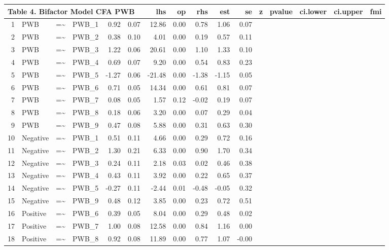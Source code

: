 \documentclass{article}
\begin{document}
\begin{table}[ht]
\centering
\begin{tabular}{rlllrrrrrrr}
 \multicolumn{ 6 }{l}{ Table 4. Bifactor Model CFA PWB} \cr 
  \hline
 & lhs & op & rhs & est & se & z & pvalue & ci.lower & ci.upper & fmi \\ 
  \hline
1 & PWB & =\~{} & PWB\_1 & 0.92 & 0.07 & 12.86 & 0.00 & 0.78 & 1.06 & 0.07 \\ 
  2 & PWB & =\~{} & PWB\_2 & 0.38 & 0.10 & 4.01 & 0.00 & 0.19 & 0.57 & 0.11 \\ 
  3 & PWB & =\~{} & PWB\_3 & 1.22 & 0.06 & 20.61 & 0.00 & 1.10 & 1.33 & 0.10 \\ 
  4 & PWB & =\~{} & PWB\_4 & 0.69 & 0.07 & 9.20 & 0.00 & 0.54 & 0.83 & 0.23 \\ 
  5 & PWB & =\~{} & PWB\_5 & -1.27 & 0.06 & -21.48 & 0.00 & -1.38 & -1.15 & 0.05 \\ 
  6 & PWB & =\~{} & PWB\_6 & 0.71 & 0.05 & 14.34 & 0.00 & 0.61 & 0.81 & 0.07 \\ 
  7 & PWB & =\~{} & PWB\_7 & 0.08 & 0.05 & 1.57 & 0.12 & -0.02 & 0.19 & 0.07 \\ 
  8 & PWB & =\~{} & PWB\_8 & 0.18 & 0.06 & 3.20 & 0.00 & 0.07 & 0.29 & 0.04 \\ 
  9 & PWB & =\~{} & PWB\_9 & 0.47 & 0.08 & 5.88 & 0.00 & 0.31 & 0.63 & 0.30 \\ 
  10 & Negative & =\~{} & PWB\_1 & 0.51 & 0.11 & 4.66 & 0.00 & 0.29 & 0.72 & 0.16 \\ 
  11 & Negative & =\~{} & PWB\_2 & 1.30 & 0.21 & 6.33 & 0.00 & 0.90 & 1.70 & 0.34 \\ 
  12 & Negative & =\~{} & PWB\_3 & 0.24 & 0.11 & 2.18 & 0.03 & 0.02 & 0.46 & 0.38 \\ 
  13 & Negative & =\~{} & PWB\_4 & 0.43 & 0.11 & 3.92 & 0.00 & 0.22 & 0.65 & 0.37 \\ 
  14 & Negative & =\~{} & PWB\_5 & -0.27 & 0.11 & -2.44 & 0.01 & -0.48 & -0.05 & 0.32 \\ 
  15 & Negative & =\~{} & PWB\_9 & 0.48 & 0.12 & 3.85 & 0.00 & 0.23 & 0.72 & 0.51 \\ 
  16 & Positive & =\~{} & PWB\_6 & 0.39 & 0.05 & 8.04 & 0.00 & 0.29 & 0.48 & 0.02 \\ 
  17 & Positive & =\~{} & PWB\_7 & 1.00 & 0.08 & 12.58 & 0.00 & 0.84 & 1.16 & 0.00 \\ 
  18 & Positive & =\~{} & PWB\_8 & 0.92 & 0.08 & 11.89 & 0.00 & 0.77 & 1.07 & -0.00 \\ 

\end{tabular}
\end{table}
\end{document}

